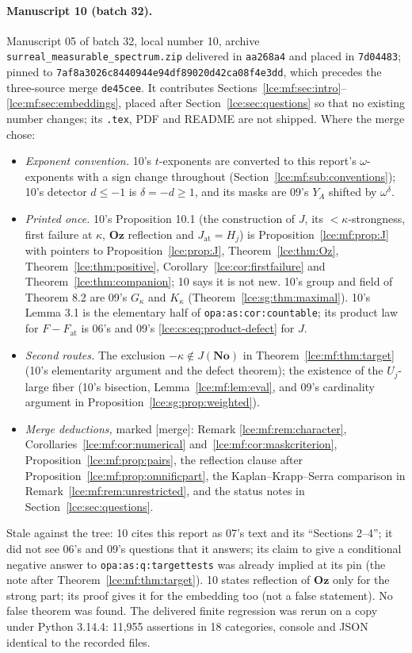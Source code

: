 \documentclass[11pt,letterpaper]{article}
\numberwithin{equation}{section}
\theoremstyle{definition}
\theoremstyle{remark}
\newcommand{\No}{\mathbf{No}}
\newcommand{\Oz}{\mathbf{Oz}}
\newcommand{\thref}[1]{Theorem~\ref{#1}}
\newcommand{\prref}[1]{Proposition~\ref{#1}}
\newcommand{\leref}[1]{Lemma~\ref{#1}}
\newcommand{\mergetag}{\textup{\textsf{\small[merge]}}}%
\newcommand{\lbl}[1]{\nolinkurl{#1}}%
\newcommand{\fn}[1]{\nolinkurl{#1}}%
\newcommand{\at}{\mathrm{at}}
\begin{document}
\paragraph{Manuscript 10 (batch 32).} Manuscript 05 of batch 32, local number
10, archive \fn{surreal_measurable_spectrum.zip} delivered in
\texttt{aa268a4} and placed in \texttt{7d04483}; pinned to
\texttt{7af8a3026c8440944e94df89020d42ca08f4e3dd}, which precedes the
three-source merge \texttt{de45cee}. It contributes
Sections~\ref{lce:mf:sec:intro}--\ref{lce:mf:sec:embeddings}, placed after
Section~\ref{lce:sec:questions} so that no existing number changes; its
\texttt{.tex}, PDF and README are not shipped. Where the merge chose:
\begin{itemize}
\item \emph{Exponent convention.} 10's $t$-exponents are converted to this
report's $\omega$-exponents with a sign change throughout
(Section~\ref{lce:mf:sub:conventions}); 10's detector $d\le-1$ is
$\delta=-d\ge1$, and its masks are 09's $Y_A$ shifted by $\omega^\delta$.
\item \emph{Printed once.} 10's Proposition 10.1 (the construction of $J$,
its ${<}\kappa$-strongness, first failure at $\kappa$, $\Oz$ reflection
and $J_{\at}=H_j$) is \prref{lce:mf:prop:J} with pointers to
\prref{lce:prop:J}, \thref{lce:thm:Oz}, \thref{lce:thm:positive},
Corollary~\ref{lce:cor:firstfailure} and \thref{lce:thm:companion}; 10 says
it is not new. 10's group and field of Theorem 8.2 are 09's $G_\kappa$ and
$K_\kappa$ (\thref{lce:sg:thm:maximal}). 10's Lemma 3.1 is the elementary
half of \lbl{opa:as:cor:countable}; its product law for $F-F_{\at}$ is 06's
and 09's \eqref{lce:cs:eq:product-defect} for $J$.
\item \emph{Second routes.} The exclusion $-\kappa\notin J(\No)$ in
\thref{lce:mf:thm:target} (10's elementarity argument and the defect
theorem); the existence of the $U_j$-large fiber (10's bisection,
\leref{lce:mf:lem:eval}, and 09's cardinality argument in
\prref{lce:sg:prop:weighted}).
\item \emph{Merge deductions,} marked \mergetag: Remark
\ref{lce:mf:rem:character}, Corollaries~\ref{lce:mf:cor:numerical}
and~\ref{lce:mf:cor:maskcriterion}, \prref{lce:mf:prop:pairs}, the
reflection clause after \prref{lce:mf:prop:omnificpart}, the
Kaplan--Krapp--Serra comparison in Remark~\ref{lce:mf:rem:unrestricted},
and the status notes in Section~\ref{lce:sec:questions}.
\end{itemize}
Stale against the tree: 10 cites this report as 07's text and its
``Sections 2--4''; it did not see 06's and 09's questions that it answers;
its claim to give a conditional negative answer to
\lbl{opa:as:q:targettests} was already implied at its pin (the note after
\thref{lce:mf:thm:target}). 10 states reflection of $\Oz$ only for the
strong part; its proof gives it for the embedding too (not a false
statement). No false theorem was found. The delivered finite regression was
rerun on a copy under Python 3.14.4: 11{,}955 assertions in 18 categories,
console and JSON identical to the recorded files.
\end{document}
